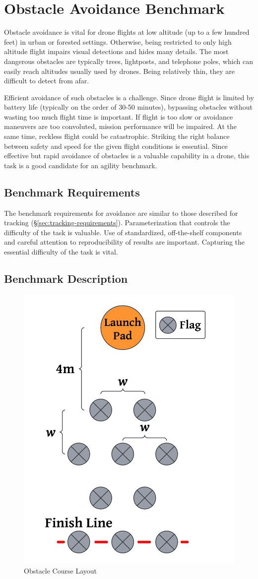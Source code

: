 \section{Obstacle Avoidance Benchmark}
\label{sec:avoidance}
Obstacle avoidance is vital for drone flights at low altitude (up to a
few hundred feet) in urban or forested settings. Otherwise, being restricted to only high altitude flight impairs visual detections and hides many details.  The most dangerous obstacles are
typically trees, lightposts, and telephone poles, which can easily
reach altitudes usually used by drones. Being  relatively thin,
they are difficult to detect from afar.  

Efficient avoidance of such obstacles is a challenge.  Since drone
flight is limited by battery life (typically on the order of 30-50
minutes), bypassing obstacles without wasting too much flight time is
important. If flight is too slow or avoidance maneuvers are too
convoluted, mission performance will be impaired.  At the same time,
reckless flight could be catastrophic.  Striking the right balance
between safety and speed for the given flight conditions is essential.
Since effective but rapid avoidance of obstacles is a valuable
capability in a drone, this task is a good candidate for an agility
benchmark.

\subsection{Benchmark Requirements}
\label{sec:avoidance-requirements}
The benchmark requirements for avoidance are similar to those described for tracking (\S\ref{sec:tracking-requirements}). Parameterization that controls the difficulty of the task is valuable. Use
of standardized, off-the-shelf components and careful attention to reproducibility of results are
important. Capturing the essential difficulty of the task is vital.

\subsection{Benchmark Description}
\label{sec:avoidance-description}

\begin{figure}
    \centering
    \includegraphics[trim=-4cm 0 0 0, width=0.5\linewidth]{chapter6/FIGS/fig-obstacle-course.png}
    \caption{Obstacle Course Layout}
    \label{fig:obstacle-course}
\end{figure}

